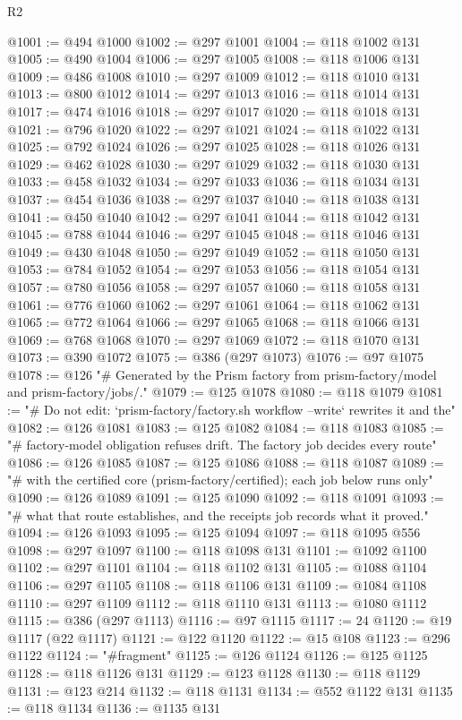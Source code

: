 \begin{lexlean}{R2}
\begin{coremodule}
@1001 := @494 @1000
@1002 := @297 @1001
@1004 := @118 @1002 @131
@1005 := @490 @1004
@1006 := @297 @1005
@1008 := @118 @1006 @131
@1009 := @486 @1008
@1010 := @297 @1009
@1012 := @118 @1010 @131
@1013 := @800 @1012
@1014 := @297 @1013
@1016 := @118 @1014 @131
@1017 := @474 @1016
@1018 := @297 @1017
@1020 := @118 @1018 @131
@1021 := @796 @1020
@1022 := @297 @1021
@1024 := @118 @1022 @131
@1025 := @792 @1024
@1026 := @297 @1025
@1028 := @118 @1026 @131
@1029 := @462 @1028
@1030 := @297 @1029
@1032 := @118 @1030 @131
@1033 := @458 @1032
@1034 := @297 @1033
@1036 := @118 @1034 @131
@1037 := @454 @1036
@1038 := @297 @1037
@1040 := @118 @1038 @131
@1041 := @450 @1040
@1042 := @297 @1041
@1044 := @118 @1042 @131
@1045 := @788 @1044
@1046 := @297 @1045
@1048 := @118 @1046 @131
@1049 := @430 @1048
@1050 := @297 @1049
@1052 := @118 @1050 @131
@1053 := @784 @1052
@1054 := @297 @1053
@1056 := @118 @1054 @131
@1057 := @780 @1056
@1058 := @297 @1057
@1060 := @118 @1058 @131
@1061 := @776 @1060
@1062 := @297 @1061
@1064 := @118 @1062 @131
@1065 := @772 @1064
@1066 := @297 @1065
@1068 := @118 @1066 @131
@1069 := @768 @1068
@1070 := @297 @1069
@1072 := @118 @1070 @131
@1073 := @390 @1072
@1075 := @386 (@297 @1073)
@1076 := @97 @1075
@1078 := @126 "# Generated by the Prism factory from prism-factory/model and prism-factory/jobs/."
@1079 := @125 @1078
@1080 := @118 @1079
@1081 := "# Do not edit: `prism-factory/factory.sh workflow --write` rewrites it and the"
@1082 := @126 @1081
@1083 := @125 @1082
@1084 := @118 @1083
@1085 := "# factory-model obligation refuses drift. The factory job decides every route"
@1086 := @126 @1085
@1087 := @125 @1086
@1088 := @118 @1087
@1089 := "# with the certified core (prism-factory/certified); each job below runs only"
@1090 := @126 @1089
@1091 := @125 @1090
@1092 := @118 @1091
@1093 := "# what that route establishes, and the receipts job records what it proved."
@1094 := @126 @1093
@1095 := @125 @1094
@1097 := @118 @1095 @556
@1098 := @297 @1097
@1100 := @118 @1098 @131
@1101 := @1092 @1100
@1102 := @297 @1101
@1104 := @118 @1102 @131
@1105 := @1088 @1104
@1106 := @297 @1105
@1108 := @118 @1106 @131
@1109 := @1084 @1108
@1110 := @297 @1109
@1112 := @118 @1110 @131
@1113 := @1080 @1112
@1115 := @386 (@297 @1113)
@1116 := @97 @1115
@1117 := 24
@1120 := @19 @1117 (@22 @1117)
@1121 := @122 @1120
@1122 := @15 @108
@1123 := @296 @1122
@1124 := "#fragment"
@1125 := @126 @1124
@1126 := @125 @1125
@1128 := @118 @1126 @131
@1129 := @123 @1128
@1130 := @118 @1129
@1131 := @123 @214
@1132 := @118 @1131
@1134 := @552 @1122 @131
@1135 := @118 @1134
@1136 := @1135 @131

\end{coremodule}
\end{lexlean}
